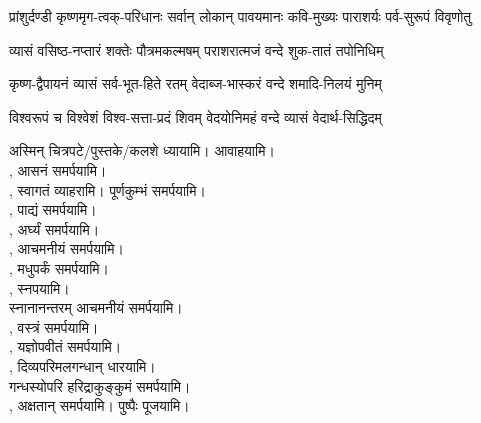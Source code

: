 \sankalpa{}

\vighneshvaraYathasthanam














{प्रांशुर्दण्डी कृष्णमृग-त्वक्-परिधानः}
{सर्वान् लोकान् पावयमानः कवि-मुख्यः}
{पाराशर्यः पर्व-सुरूपं विवृणोतु}

\twolineshloka
{व्यासं वसिष्ठ-नप्तारं शक्तेः पौत्रमकल्मषम्}
{पराशरात्मजं वन्दे शुक-तातं तपोनिधिम्}

\twolineshloka
{कृष्ण-द्वैपायनं व्यासं सर्व-भूत-हिते रतम्}
{वेदाब्ज-भास्करं वन्दे शमादि-निलयं मुनिम्}

\twolineshloka
{विश्वरूपं च विश्वेशं विश्व-सत्ता-प्रदं शिवम्}
{वेदयोनिमहं वन्दे व्यासं वेदार्थ-सिद्धिदम्}

अस्मिन् चित्रपटे/पुस्तके/कलशे \acharyan{} ध्यायामि। \acharyan{} आवाहयामि।\\
\acharyebhyonamah{}, आसनं समर्पयामि।\\
\acharyebhyonamah{}, स्वागतं व्याहरामि। पूर्णकुम्भं समर्पयामि।\\
\acharyebhyonamah{}, पाद्यं समर्पयामि।\\
\acharyebhyonamah{}, अर्घ्यं समर्पयामि।\\
\acharyebhyonamah{}, आचमनीयं समर्पयामि।\\
\acharyebhyonamah{}, मधुपर्कं समर्पयामि।\\
\acharyebhyonamah{}, स्नपयामि।\\
स्नानानन्तरम् आचमनीयं समर्पयामि।\\
\acharyebhyonamah{}, वस्त्रं समर्पयामि।\\
\acharyebhyonamah{}, यज्ञोपवीतं समर्पयामि।\\
\acharyebhyonamah{}, दिव्यपरिमलगन्धान् धारयामि।\\ गन्धस्योपरि हरिद्राकुङ्कुमं समर्पयामि।\\
\acharyebhyonamah{}, अक्षतान् समर्पयामि। पुष्पैः पूजयामि।

\begin{center}
    \begingroup
        \setlength{\columnseprule}{1pt}
        \let\chapt\sect
            
    \endgroup
\end{center}



